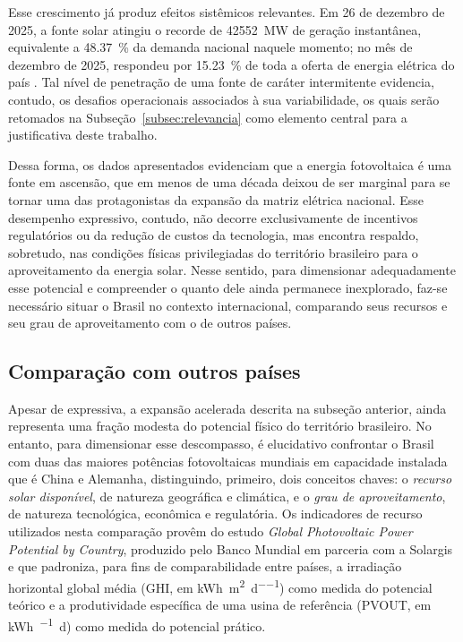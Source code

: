 Esse crescimento já produz efeitos sistêmicos relevantes. Em 26 de dezembro de 2025, a fonte solar atingiu o recorde de \SI{42552}{\mega\watt} de geração instantânea, equivalente a \SI{48,37}{\percent} da demanda nacional naquele momento; no mês de dezembro de 2025, respondeu por \SI{15,23}{\percent} de toda a oferta de energia elétrica do país \cite{absolar2026infografico}. Tal nível de penetração de uma fonte de caráter intermitente evidencia, contudo, os desafios operacionais associados à sua variabilidade, os quais serão retomados na Subseção~\ref{subsec:relevancia} como elemento central para a justificativa deste trabalho.

Dessa forma, os dados apresentados evidenciam que a energia fotovoltaica é uma fonte em ascensão, que em menos de uma década deixou de ser marginal para se tornar uma das protagonistas da expansão da matriz elétrica nacional. Esse desempenho expressivo, contudo, não decorre exclusivamente de incentivos regulatórios ou da redução de custos da tecnologia, mas encontra respaldo, sobretudo, nas condições físicas privilegiadas do território brasileiro para o aproveitamento da energia solar. Nesse sentido, para dimensionar adequadamente esse potencial e compreender o quanto dele ainda permanece inexplorado, faz-se necessário situar o Brasil no contexto internacional, comparando seus recursos e seu grau de aproveitamento com o de outros países.

\subsection{Comparação com outros países}
\label{subsec:comparacao_paises}

Apesar de expressiva, a expansão acelerada descrita na subseção anterior, ainda
representa uma fração modesta do potencial físico do território brasileiro. No entanto, para
dimensionar esse descompasso, é elucidativo confrontar o Brasil com duas das
maiores potências fotovoltaicas mundiais em capacidade instalada que é China e
Alemanha, distinguindo, primeiro, dois conceitos chaves: o
\emph{recurso solar disponível}, de natureza geográfica e climática, e o
\emph{grau de aproveitamento}, de natureza tecnológica,
econômica e regulatória. Os indicadores de recurso utilizados nesta comparação
provêm do estudo \textit{Global Photovoltaic Power Potential by Country}, produzido pelo
Banco Mundial em parceria com a Solargis \cite{WorldBank2020} e que padroniza,
para fins de comparabilidade entre países, a irradiação horizontal global
média (GHI, em \si{\kWh\per\square\metre\per\day}) como medida do potencial
teórico e a produtividade específica de uma usina de referência (PVOUT, em
\si{\kWh\per\kWp\day}) como medida do potencial prático.

